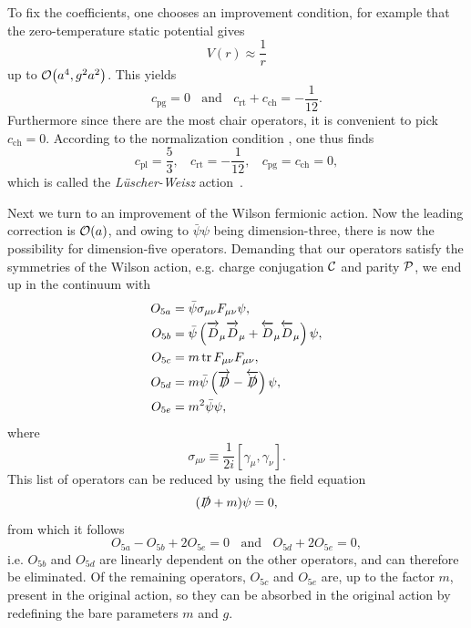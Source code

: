 To fix the coefficients, one chooses an improvement condition, for example
that the zero-temperature static potential gives
\begin{equation}
  V(r)\approx\frac{1}{r}
\end{equation}
up to $\order{a^4,g^2a^2}$. This yields 
\begin{equation}
  c_\text{pg}=0~~~~\text{and}~~~~c_\text{rt}+c_\text{ch}=-\frac{1}{12}.
\end{equation}
Furthermore since there are the most chair operators, it is convenient
to pick $c_\text{ch}=0$. According to the normalization condition
, one thus finds
\begin{equation}
  c_\text{pl}=\frac{5}{3},~~~~c_\text{rt}=-\frac{1}{12},~~~~
    c_\text{pg}=c_\text{ch}=0,
\end{equation}
which is called the {\it L\"uscher-Weisz} action~\cite{luscher_shell_1985}.

Next we turn to an improvement of the Wilson fermionic action. Now the leading
correction is $\order{a}$, and owing to $\bar{\psi}\psi$ being dimension-three,
there is now the possibility for dimension-five operators. Demanding that
our operators satisfy the symmetries of the Wilson action, e.g.
charge conjugation $\mathcal{C}$ and parity $\mathcal{P}$, we end up in the
continuum with 
\begin{equation}\begin{aligned}
  O_{5a}&=\bar\psi \sigma_{\mu\nu}F_{\mu\nu}\psi, \\
  O_{5b}&=\bar\psi\left(\overrightarrow{D\strut}_\mu\overrightarrow{D\strut}_\mu
                          +\overleftarrow{D\strut}_\mu\overleftarrow{D\strut}_\mu\right)\psi,\\ 
  O_{5c}&=m \tr F_{\mu\nu}F_{\mu\nu},\\
  O_{5d}&=m\bar\psi\left(\overrightarrow{\slashed{D}\strut}
                         -\overleftarrow{\slashed{D}\strut}\right)\psi,\\
  O_{5e}&=m^2 \bar\psi \psi,
\end{aligned}\end{equation}
where
\begin{equation}
  \sigma_{\mu\nu}\equiv\frac{1}{2i}[\gamma_\mu,\gamma_\nu].
\end{equation}
This list of operators can be reduced by using the field equation
\begin{equation}
 (\slashed{D}+m)\psi=0,
\end{equation}
from which it follows
\begin{equation}
  O_{5a}-O_{5b}+2O_{5e}=0~~~~\text{and}~~~~O_{5d}+2O_{5e}=0,
\end{equation}
i.e. $O_{5b}$ and $O_{5d}$ are linearly dependent on the other operators,
and can therefore be eliminated. Of the remaining operators, $O_{5c}$ and
$O_{5e}$ are, up to the factor $m$, present in the original action, so
they can be absorbed in the original action by redefining the bare
parameters $m$ and $g$.

